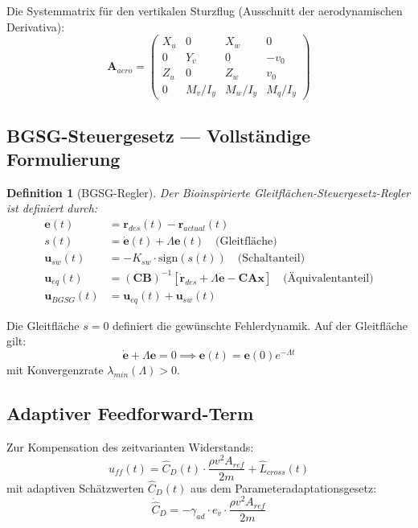 ﻿\documentclass[12pt,a4paper]{article}
\newtheorem{definition}{Definition}[section]
\theoremstyle{remark}
\begin{document}
	Die Systemmatrix für den vertikalen Sturzflug (Ausschnitt der aerodynamischen Derivativa):
	\begin{equation}
		\mathbf{A}_{aero} = \begin{pmatrix}
			X_u & 0 & X_w & 0 \\
			0 & Y_v & 0 & -v_0 \\
			Z_u & 0 & Z_w & v_0 \\
			0 & M_v/I_y & M_w/I_y & M_q/I_y
		\end{pmatrix}
	\end{equation}
	
	\subsection{BGSG-Steuergesetz --- Vollständige Formulierung}
	
	\begin{definition}[BGSG-Regler]
		Der Bioinspirierte Gleitflächen-Steuergesetz-Regler ist definiert durch:
		\begin{align}
			\mathbf{e}(t) &= \mathbf{r}_{des}(t) - \mathbf{r}_{actual}(t) \\
			s(t) &= \dot{\mathbf{e}}(t) + \Lambda \mathbf{e}(t) \quad \text{(Gleitfläche)} \\
			\mathbf{u}_{sw}(t) &= -K_{sw} \cdot \text{sign}(s(t)) \quad \text{(Schaltanteil)} \\
			\mathbf{u}_{eq}(t) &= (\mathbf{CB})^{-1}\left[\dot{\mathbf{r}}_{des} + \Lambda\dot{\mathbf{e}} - \mathbf{CA}\mathbf{x}\right] \quad \text{(Äquivalentanteil)} \\
			\mathbf{u}_{BGSG}(t) &= \mathbf{u}_{eq}(t) + \mathbf{u}_{sw}(t)
		\end{align}
	\end{definition}
	
	Die Gleitfläche $s = 0$ definiert die gewünschte Fehlerdynamik. Auf der Gleitfläche gilt:
	\begin{equation}
		\dot{\mathbf{e}} + \Lambda\mathbf{e} = 0 \implies \mathbf{e}(t) = \mathbf{e}(0) e^{-\Lambda t}
	\end{equation}
	mit Konvergenzrate $\lambda_{min}(\Lambda) > 0$.
	
	\subsection{Adaptiver Feedforward-Term}
	
	Zur Kompensation des zeitvarianten Widerstands:
	\begin{equation}
		u_{ff}(t) = \hat{C}_D(t) \cdot \frac{\rho v^2 A_{ref}}{2m} + \hat{L}_{cross}(t)
	\end{equation}
	mit adaptiven Schätzwerten $\hat{C}_D(t)$ aus dem Parameteradaptationsgesetz:
	\begin{equation}
		\dot{\hat{C}}_D = -\gamma_{ad} \cdot e_v \cdot \frac{\rho v^2 A_{ref}}{2m}
	\end{equation}
	
\end{document}
